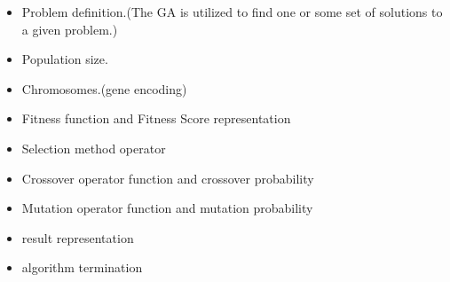 \begin{itemize}
\item Problem definition.(The GA is utilized to find one or some set of solutions to a given problem.)
\item Population size.
\item Chromosomes.(gene encoding)
\item Fitness function and Fitness Score representation
\item Selection method operator
\item Crossover operator function and crossover probability
\item Mutation operator function and mutation probability
\item result representation
\item algorithm termination
\end{itemize}



